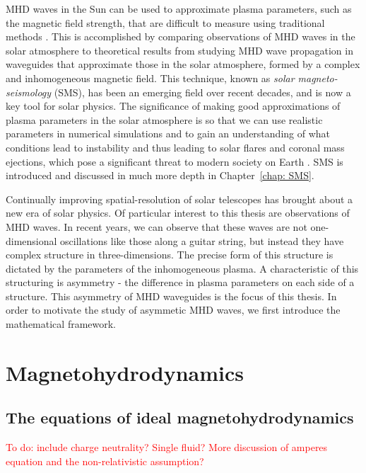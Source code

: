 \documentclass[12pt]{../style-files/ociamthesis}
\begin{document}
MHD waves in the Sun can be used to approximate plasma parameters, such as the magnetic field strength, that are difficult to measure using traditional methods \citep{nak_etal05,dem_etal12}. This is accomplished by comparing observations of MHD waves in the solar atmosphere to theoretical results from studying MHD wave propagation in waveguides that approximate those in the solar atmosphere, formed by a complex and inhomogeneous magnetic field. This technique, known as \textit{solar magneto-seismology} (SMS), has been an emerging field over recent decades, and is now a key tool for solar physics. The significance of making good approximations of plasma parameters in the solar atmosphere is so that we can use realistic parameters in numerical simulations and to gain an understanding of what conditions lead to instability and thus leading to solar flares and coronal mass ejections, which pose a significant threat to modern society on Earth \citep{cab15}. SMS is introduced and discussed in much more depth in Chapter~\ref{chap: SMS}.

Continually improving spatial-resolution of solar telescopes has brought about a new era of solar physics. Of particular interest to this thesis are observations of MHD waves. In recent years, we can observe that these waves are not one-dimensional oscillations like those along a guitar string, but instead they have complex structure in three-dimensions. The precise form of this structure is dictated by the parameters of the inhomogeneous plasma. A characteristic of this structuring is asymmetry - the difference in plasma parameters on each side of a structure. This asymmetry of MHD waveguides is the focus of this thesis. In order to motivate the study of asymmetic MHD waves, we first introduce the mathematical framework.


\section{Magnetohydrodynamics}
\label{sec: MHD}

\subsection{The equations of ideal magnetohydrodynamics} \label{sec: MHD eqns}

\textcolor{red}{To do: include charge neutrality? Single fluid? More discussion of amperes equation and the non-relativistic assumption?}
\end{document}
